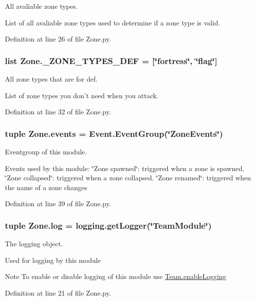 All avaliable zone types. 

List of all avaliable zone types used to determine if a zone type is valid. 

Definition at line 26 of file Zone.py.

\hypertarget{namespace_zone_aad0e42e8c895a1cedce5321c83a677b8}{
\subsubsection[{\_\-ZONE\_\-TYPES\_\-DEF}]{\setlength{\rightskip}{0pt plus 5cm}list {\bf Zone.\_\-ZONE\_\-TYPES\_\-DEF} = \mbox{[}\char`\"{}fortress\char`\"{}, \char`\"{}flag\char`\"{}\mbox{]}}}
\label{namespace_zone_aad0e42e8c895a1cedce5321c83a677b8}


All zone types that are for def. 

List of zone types you don't need when you attack. 

Definition at line 32 of file Zone.py.

\hypertarget{namespace_zone_a2cf3edd088ca6482872ba018b81ef52a}{
\subsubsection[{events}]{\setlength{\rightskip}{0pt plus 5cm}tuple {\bf Zone.events} = {\bf Event.EventGroup}(\char`\"{}ZoneEvents\char`\"{})}}
\label{namespace_zone_a2cf3edd088ca6482872ba018b81ef52a}


Eventgroup of this module. 

Events used by this module: \char`\"{}Zone spawned\char`\"{}: triggered when a zone is spawned. \char`\"{}Zone collapsed\char`\"{}: triggered when a zone collapsed. \char`\"{}Zone renamed\char`\"{}: triggered when the name of a zone changes 

Definition at line 39 of file Zone.py.

\hypertarget{namespace_zone_aad90704d2c88929bd92b7acf2b9a09d6}{
\subsubsection[{log}]{\setlength{\rightskip}{0pt plus 5cm}tuple {\bf Zone.log} = logging.getLogger(\char`\"{}TeamModule\char`\"{})}}
\label{namespace_zone_aad90704d2c88929bd92b7acf2b9a09d6}


The logging object. 

Used for logging by this module \begin{DoxyNote}{Note}
To enable or disable logging of this module use \hyperlink{namespace_team_a391de1d02502546ec5d88de1632b3bc2}{Team.enableLogging} 
\end{DoxyNote}


Definition at line 21 of file Zone.py.

